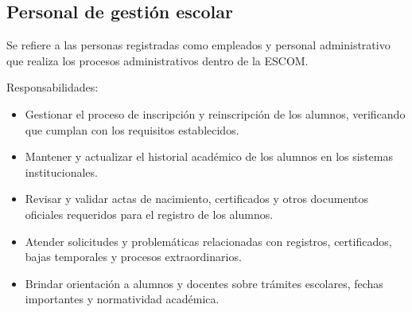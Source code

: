 \begin{Usuario}{\hypertarget{tPersonalGestion}{\subsection{Personal de gestión escolar}}}{
		Se refiere a las personas registradas como empleados y personal administrativo que realiza los procesos administrativos dentro de la ESCOM.
	}
	\item[Responsabilidades:] \cdtEmpty
	\begin{itemize}

		\item Gestionar el proceso de inscripción y reinscripción de los alumnos, verificando que cumplan con los requisitos establecidos.
		\item Mantener y actualizar el historial académico de los alumnos en los sistemas institucionales.
		\item Revisar y validar actas de nacimiento, certificados y otros documentos oficiales requeridos para el registro de los alumnos.
		\item Atender solicitudes y problemáticas relacionadas con registros, certificados, bajas temporales y procesos extraordinarios.
		\item Brindar orientación a alumnos y docentes sobre trámites escolares, fechas importantes y normatividad académica.
	\end{itemize}


\end{Usuario}

